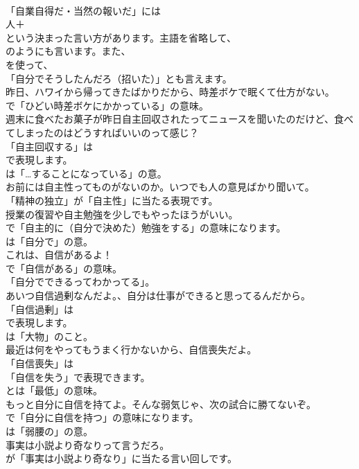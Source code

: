 \documentclass[8pt]{extreport}
\begin{document}
\begin{CJK}{UTF8}{min}
\\	「自業自得だ・当然の報いだ」には
\\	人＋
\\	という決まった言い方があります。主語を省略して、
\\	のようにも言います。また、
\\	を使って、
\\	「自分でそうしたんだろ（招いた）」とも言えます。	
\\	昨日、ハワイから帰ってきたばかりだから、時差ボケで眠くて仕方がない。 
\\	で「ひどい時差ボケにかかっている」の意味。	
\\	週末に食べたお菓子が昨日自主回収されたってニュースを聞いたのだけど、食べてしまったのはどうすればいいのって感じ？ 
\\	「自主回収する」は 
\\	で表現します。
\\	は「…することになっている」の意。	
\\	お前には自主性ってものがないのか。いつでも人の意見ばかり聞いて。 
\\	「精神の独立」が「自主性」に当たる表現です。	
\\	授業の復習や自主勉強を少しでもやったほうがいい。 
\\	で「自主的に（自分で決めた）勉強をする」の意味になります。
\\	は「自分で」の意。	
\\	これは、自信があるよ！ 
\\	で「自信がある」の意味。
\\	「自分でできるってわかってる」。	
\\	あいつ自信過剰なんだよ。、自分は仕事ができると思ってるんだから。 
\\	「自信過剰」は
\\	で表現します。
\\	は「大物」のこと。	
\\	最近は何をやってもうまく行かないから、自信喪失だよ。 
\\	「自信喪失」は
\\	「自信を失う」で表現できます。
\\	とは「最低」の意味。	
\\	もっと自分に自信を持てよ。そんな弱気じゃ、次の試合に勝てないぞ。 
\\	で「自分に自信を持つ」の意味になります。
\\	は「弱腰の」の意。	
\\	事実は小説より奇なりって言うだろ。 
\\	が「事実は小説より奇なり」に当たる言い回しです。	

\end{CJK}
\end{document}
